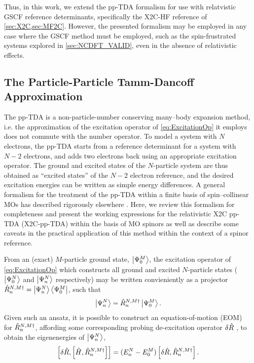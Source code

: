 Thus, in this work, we extend the pp-TDA formalism for use with 
relatvistic GSCF reference determinants, specifically the X2C-HF reference of \cref{sec:X2C,sec:MF2C}. 
However, the presented formalism may be employed in any case where the GSCF method must be
employed, such as the spin-frustrated systems explored in \cref{sec:NCDFT_VALID},
even in the absence of relativistic effects. 




\subsection{The Particle-Particle Tamm-Dancoff Approximation}
\label{subsec:ppTDA}
The pp-TDA is a non-particle-number conserving many--body expansion method, i.e. the
approximation of the excitation operator of \cref{eq:ExcitationOp} it employs does not commute with the number
operator.  To model a system with $N$ electrons, the pp-TDA starts from a
reference determinant for a system with $N-2$  electrons, and adds two
electrons back using an appropriate excitation operator.  The ground and
excited states of the $N$-particle system are thus obtained as ``excited
states'' of the $N-2$ electron reference, and the desired excitation energies
can be written as simple energy differences.  A general formalism for the
treatment of the pp-TDA within a finite basis of spin--collinear MOs has
described rigorously elsewhere
\cite{Yang13_224105,Yang13_18A522,Yang13_104112}.  Here, we review this
formalism for completeness and present the working expressions for the
relativistic X2C pp-TDA (X2C-pp-TDA) within the basis of MO spinors as well as
describe some caveats in the practical application of this method within the
context of a spinor reference.

From an (exact) $M$-particle ground state, $\left\vert \Psi_0^M \right\rangle$, the excitation operator
of \cref{eq:ExcitationOp} which constructs all ground and excited 
$N$-particle states ($\left\vert \Psi_0^N \right\rangle$ and $\left\vert \Psi_n^N \right\rangle$ respectively) may be written
convieniently as a projector $\hat{R}^{N,M\dagger}_n = \left\vert \Psi_n^N \right\rangle\left\langle \Psi_0^M \right\vert$, such that
\begin{equation}
  \left\vert \Psi_n^N \right\rangle = \hat{R}^{N,M\dagger}_n \left\vert \Psi_0^M \right\rangle.
\end{equation}
Given such an ansatz, it is possible to construct an equation-of-motion (EOM) \cite{SchuckBook_04} 
for $\hat{R}_n^{N,M\dagger}$, affording some corresponding
probing de-excitation operator $\delta \hat{R}$ , to obtain the eigenenergies of $\left\vert \Psi_n^N \right\rangle$,
\begin{equation}
\label{eq:EOM}
  \left[ \delta \hat{R},\left[ \hat{H}, \hat{R}_n^{N,M\dagger} \right]\right] = 
    (E^N_n - E^M_0)\left[\delta \hat{R}, \hat{R}^{N,M\dagger}_n \right].
\end{equation}

